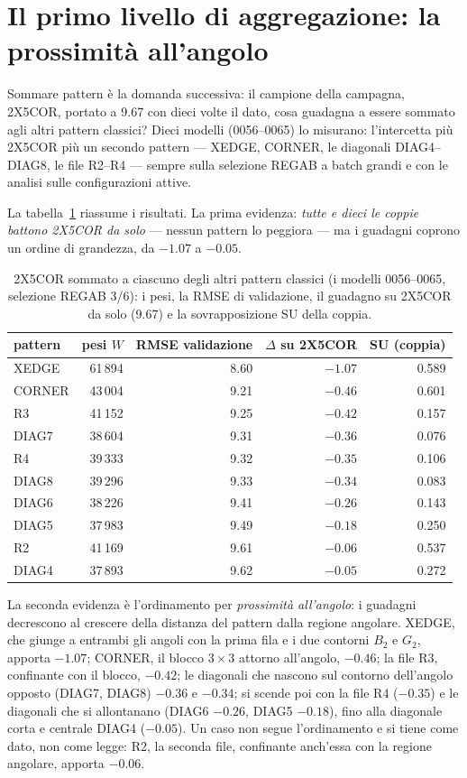 \section{Il primo livello di aggregazione: la prossimità all'angolo}

Sommare pattern è la domanda successiva: il campione della campagna,
2X5COR, portato a 9.67 con dieci volte il dato, cosa guadagna a
essere sommato agli altri pattern classici? Dieci modelli
(0056--0065) lo misurano: l'intercetta più 2X5COR più un secondo
pattern — XEDGE, CORNER, le diagonali DIAG4--DIAG8, le file
R2--R4 — sempre sulla selezione REGAB a batch grandi e con le
analisi sulle configurazioni attive.

La tabella~\ref{tab:feature-base-pattern-aggregazione} riassume i
risultati. La prima evidenza: \emph{tutte e dieci le coppie battono
2X5COR da solo} — nessun pattern lo peggiora — ma i
guadagni coprono un ordine di grandezza, da $-1.07$ a $-0.05$.

\begin{table}[ht]
\centering
\begin{tabular}{lrrrr}
\toprule
pattern & pesi $W$ & RMSE validazione & $\Delta$ su 2X5COR & SU (coppia) \\
\midrule
XEDGE  & 61\,894 & 8.60 & $-1.07$ & 0.589 \\
CORNER & 43\,004 & 9.21 & $-0.46$ & 0.601 \\
R3     & 41\,152 & 9.25 & $-0.42$ & 0.157 \\
DIAG7  & 38\,604 & 9.31 & $-0.36$ & 0.076 \\
R4     & 39\,333 & 9.32 & $-0.35$ & 0.106 \\
DIAG8  & 39\,296 & 9.33 & $-0.34$ & 0.083 \\
DIAG6  & 38\,226 & 9.41 & $-0.26$ & 0.143 \\
DIAG5  & 37\,983 & 9.49 & $-0.18$ & 0.250 \\
R2     & 41\,169 & 9.61 & $-0.06$ & 0.537 \\
DIAG4  & 37\,893 & 9.62 & $-0.05$ & 0.272 \\
\bottomrule
\end{tabular}
\caption{2X5COR sommato a ciascuno degli altri pattern classici (i
modelli 0056--0065, selezione REGAB 3/6): i pesi, la RMSE di
validazione, il guadagno su 2X5COR da solo (9.67) e la sovrapposizione
SU della coppia.}
\label{tab:feature-base-pattern-aggregazione}
\end{table}

La seconda evidenza è l'ordinamento per \emph{prossimità
all'angolo}: i guadagni decrescono al crescere della distanza del
pattern dalla regione angolare. XEDGE, che giunge a entrambi gli
angoli con la prima fila e i due contorni $B_2$ e $G_2$, apporta
$-1.07$; CORNER, il blocco $3\times3$ attorno all'angolo, $-0.46$;
la file R3, confinante con il blocco, $-0.42$; le diagonali che
nascono sul contorno dell'angolo opposto (DIAG7, DIAG8) $-0.36$ e
$-0.34$; si scende poi con la file R4 ($-0.35$) e le diagonali che
si allontanano (DIAG6 $-0.26$, DIAG5 $-0.18$), fino alla diagonale
corta e centrale DIAG4 ($-0.05$). Un caso non segue l'ordinamento e
si tiene come dato, non come legge: R2, la seconda file, confinante
anch'essa con la regione angolare, apporta $-0.06$.

